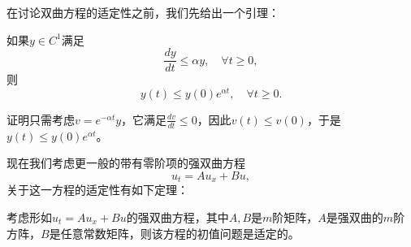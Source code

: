 \documentclass[a4paper,10pt]{ctexart}
\begin{document}
在讨论双曲方程的适定性之前，我们先给出一个引理：
\begin{lemma}
    如果$ y\in C^1 $满足
    \begin{equation}
        \frac{dy}{dt} \leqslant \alpha y,\quad \forall t\geqslant 0,
    \end{equation}
    则
    \begin{equation}
        y(t) \leqslant y(0)e^{\alpha t},\quad \forall t\geqslant 0.
    \end{equation}
\end{lemma}
\noindent 证明只需考虑$ v = e^{-\alpha t}y $，它满足$ \frac{dv}{dt} \leqslant 0 $，因此$ v(t) \leqslant v(0) $，于是$ y(t) \leqslant y(0)e^{\alpha t} $。

现在我们考虑更一般的带有零阶项的强双曲方程
\[
    u_t = Au_x + Bu,  
\]
关于这一方程的适定性有如下定理：
\begin{theorem}
    考虑形如$ u_t = Au_x + Bu $的强双曲方程，其中$ A,B $是$ m $阶矩阵，$ A $是强双曲的$ m $阶方阵，$ B $是任意常数矩阵，则该方程的初值问题是适定的。
\end{theorem}
\end{document}
